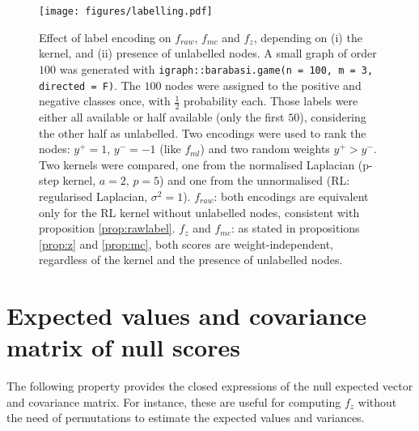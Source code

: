 \documentclass[12pt]{article}  %
\begin{document}
\begin{figure}[th]
\centering
\texttt{[image: figures/labelling.pdf]}
\caption{
Effect of label encoding on $f_{raw}$, $f_{mc}$ and $f_z$, depending on (i) the kernel, and (ii) presence of unlabelled nodes.
A small graph of order $100$ was generated with \texttt{igraph::barabasi.game(n = 100, m = 3, directed = F)}. 
The $100$ nodes were assigned to the positive and negative classes once, with $\frac{1}{2}$ probability each.
Those labels were either all available or half available (only the first $50$), considering the other half as unlabelled.
Two encodings were used to rank the nodes: $y^+ = 1$, $y^- = -1$ (like $f_{ml}$) and two random weights $y^+ > y^-$.
Two kernels were compared, one from the normalised Laplacian (p-step kernel, $a = 2$, $p = 5$) and one from the unnormalised (RL: regularised Laplacian, $\sigma^2 = 1$). 
$f_{raw}$: both encodings are equivalent only for the RL kernel without unlabelled nodes, consistent with proposition \ref{prop:rawlabel}.
$f_{z}$ and $f_{mc}$: as stated in propositions \ref{prop:z} and \ref{prop:mc}, both scores are weight-independent, regardless of the kernel and the presence of unlabelled nodes.
}
\label{fig:labelling}
\end{figure}

\section*{Expected values and covariance matrix of null scores}

The following property provides the closed expressions of the null expected vector and covariance matrix. 
For instance, these are useful for computing $f_z$ without the need of permutations to estimate the expected values and variances.
\end{document}
